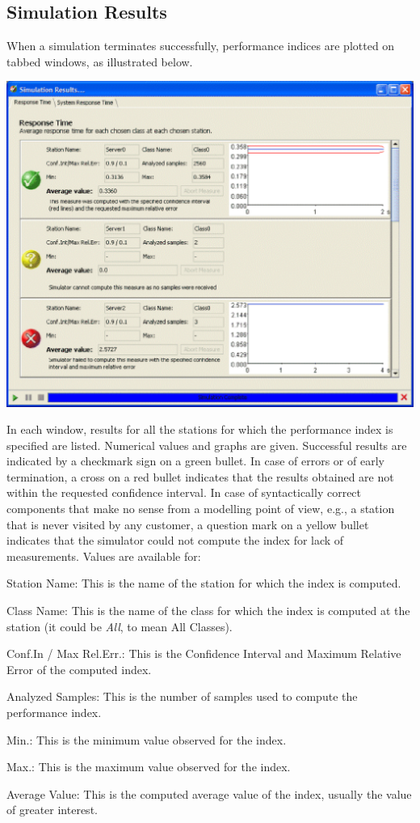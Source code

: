 \begin{description*}
\section{Simulation Results}
\label{sec:SimulationResults}
When a simulation terminates successfully, performance indices are plotted on tabbed windows, as illustrated below.
\begin{center}
\includegraphics[scale=.5]{img/jsim/sim_window.eps}
\end{center}
In each window, results for all the stations for which the
performance index is specified are listed. Numerical values and
graphs are given. Successful results are indicated by a checkmark
sign on a green bullet. In case of errors or of early termination,
a cross on a red bullet indicates that the results obtained are
not within the requested confidence interval. In case of
syntactically correct components that make no sense from a
modelling point of view, e.g., a station that is never visited by
any customer, a question mark on a yellow bullet indicates that
the simulator could not compute the index for lack of
measurements. Values are available for:
\begin{itemize*}
\item Station Name: This is the name of the station for which the index is computed.
\item Class Name: This is the name of the class for which the index is computed at the station (it could be \emph{All}, to mean All Classes).
\item Conf.In / Max Rel.Err.: This is the Confidence Interval and Maximum Relative Error of the computed index.
\item Analyzed Samples: This is the number of samples used to compute the performance index.
\item Min.: This is the minimum value observed for the index.
\item Max.: This is the maximum value observed for the index.
\item Average Value: This is the computed average value of the index, usually the value of greater interest.
\end{itemize*}


\end{description*}
